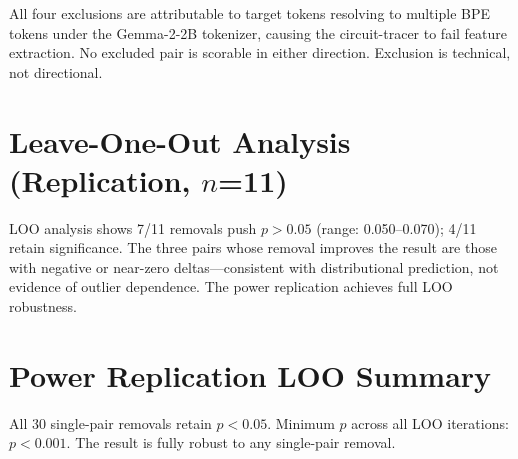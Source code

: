 \documentclass{article}
\begin{document}
All four exclusions are attributable to target tokens resolving to multiple BPE tokens under 
the Gemma-2-2B tokenizer, causing the circuit-tracer to fail feature extraction. No excluded 
pair is scorable in either direction. Exclusion is technical, not directional.

\section{Leave-One-Out Analysis (Replication, $n$=11)}

LOO analysis shows 7/11 removals push $p > 0.05$ (range: 0.050--0.070); 4/11 retain 
significance. The three pairs whose removal improves the result are those with negative or 
near-zero deltas---consistent with distributional prediction, not evidence of outlier dependence. 
The power replication achieves full LOO robustness.

\section{Power Replication LOO Summary}

All 30 single-pair removals retain $p < 0.05$. Minimum $p$ across all LOO iterations: 
$p < 0.001$. The result is fully robust to any single-pair removal.
\end{document}
